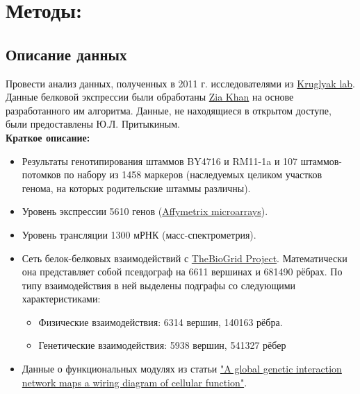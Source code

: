 \documentclass[11pt,a4paper]{report}
\theoremstyle{definition}
\theoremstyle{definition}
\theoremstyle{definition}
\begin{document}
	\section{Методы:}
	\subsection{Описание данных}
	Провести анализ данных, полученных в 2011 г. исследователями из \href{https://labs.genetics.ucla.edu/kruglyak/home}{Kruglyak lab}. Данные белковой экспрессии были обработаны \href{https://scholar.google.com/citations?user=gJkhFkgAAAAJ&hl=en}{Zia Khan} на основе разработанного им алгоритма. Данные, не находящиеся в открытом доступе, были предоставлены Ю.Л. Притыкиным.\\ 
	\textbf{Краткое описание:} 
	\begin{itemize}
			\item Результаты генотипирования штаммов BY4716 и RM11-1a и 107 штаммов-потомков по набору из 1458 маркеров (наследуемых целиком участков генома, на которых родительские штаммы различны). 
			\item Уровень экспрессии 5610 генов (\href{http://www.thermofisher.com/sg/en/home/life-science/microarray-analysis/affymetrix.html}{Affymetrix microarrays}).
			\item Уровень трансляции 1300 мРНК (масс-спектрометрия).
			\item Сеть белок-белковых взаимодействий с \href{https://thebiogrid.org/}{TheBioGrid Project}. Математически она представляет собой псевдограф на 6611 вершинах и 681490 рёбрах. По типу взаимодействия в ней выделены подграфы со следующими характеристиками:
			\begin{itemize}
				\item Физические взаимодействия: 6314 вершин, 140163 рёбра.
				\item Генетические взаимодействия: 5938  вершин, 541327 рёбер
			\end{itemize}
			\item Данные о функциональных модулях из статьи \href{http://boonelab.ccbr.utoronto.ca/supplement/costanzo2016/}{"A global genetic interaction network maps a wiring diagram of cellular function"}.
	\end{itemize}
\end{document}
